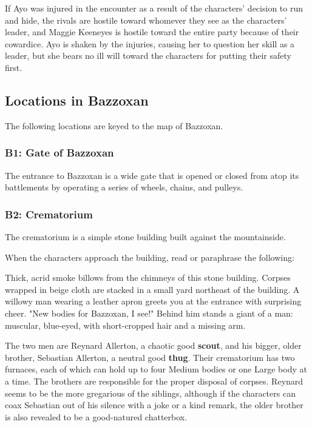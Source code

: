 \documentclass[letterpaper, 11pt, bg=full, twocolumn]{dndbook}
\begin{document}
If Ayo was injured in the encounter as a result of the characters' decision to run and hide, the rivals are hostile toward whomever they see as the characters' leader, and Maggie Keeneyes is hostile toward the entire party because of their cowardice. Ayo is shaken by the injuries, causing her to question her skill as a leader, but she bears no ill will toward the characters for putting their safety first.

\subsection{Locations in Bazzoxan}

The following locations are keyed to the map of Bazzoxan.



\subsubsection{B1: Gate of Bazzoxan}

The entrance to Bazzoxan is a wide gate that is opened or closed from atop its battlements by operating a series of wheels, chains, and pulleys.

\subsubsection{B2: Crematorium}

The crematorium is a simple stone building built against the mountainside.

When the characters approach the building, read or paraphrase the following:

\begin{DndReadAloud}
Thick, acrid smoke billows from the chimneys of this stone building. Corpses wrapped in beige cloth are stacked in a small yard northeast of the building.
A willowy man wearing a leather apron greets you at the entrance with surprising cheer. "New bodies for Bazzoxan, I see!" Behind him stands a giant of a man: muscular, blue-eyed, with short-cropped hair and a missing arm.
\end{DndReadAloud}

The two men are Reynard Allerton, a chaotic good \textbf{scout}, and his bigger, older brother, Sebastian Allerton, a neutral good \textbf{thug}. Their crematorium has two furnaces, each of which can hold up to four Medium bodies or one Large body at a time. The brothers are responsible for the proper disposal of corpses. Reynard seems to be the more gregarious of the siblings, although if the characters can coax Sebastian out of his silence with a joke or a kind remark, the older brother is also revealed to be a good-natured chatterbox.
\end{document}
